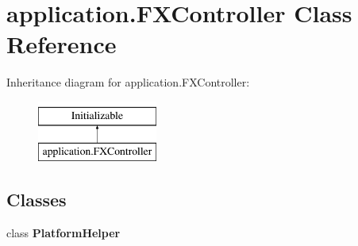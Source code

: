 \hypertarget{classapplication_1_1_f_x_controller}{}\section{application.\+F\+X\+Controller Class Reference}
\label{classapplication_1_1_f_x_controller}
Inheritance diagram for application.\+F\+X\+Controller\+:\begin{figure}[H]
\begin{center}
\leavevmode
\includegraphics[height=2.000000cm]{classapplication_1_1_f_x_controller}
\end{center}
\end{figure}
\subsection*{Classes}
\begin{DoxyCompactItemize}
\item 
class {\bfseries Platform\+Helper}
\end{DoxyCompactItemize}
